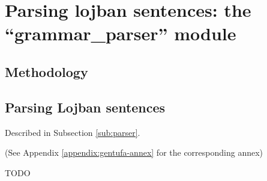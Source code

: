 \chapter{Parsing lojban sentences: the ``grammar\_parser'' module}

\section{Methodology}

\section{Parsing Lojban sentences}
\label{sec:parsing_lojban_sentences}

Described in Subsection \ref{sub:parser}.

(See Appendix \ref{appendix:gentufa-annex} for the corresponding annex)

TODO